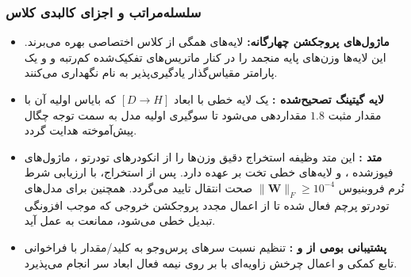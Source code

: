 \subsubsection*{سلسله‌مراتب و اجزای کالبدی کلاس}
\begin{itemize}
    \item \textbf{ماژول‌های پروجکشن چهارگانه:} لایه‌های  همگی از کلاس اختصاصی  بهره می‌برند. این لایه‌ها وزن‌های پایه منجمد  را در کنار ماتریس‌های تفکیک‌شده کم‌رتبه  و  و یک پارامتر مقیاس‌گذار یادگیری‌پذیر به نام  نگهداری می‌کنند.
    \item \textbf{لایه گیتینگ تصحیح‌شده :} یک لایه خطی با ابعاد $[D \to H]$ که بایاس اولیه آن با مقدار مثبت $1.8$ مقداردهی می‌شود تا سوگیری اولیه مدل به سمت توجه چگال پیش‌آموخته هدایت گردد.
    \item \textbf{متد :} این متد وظیفه استخراج دقیق وزن‌ها را از انکودرهای تودرتو ، ماژول‌های فیوزشده ، و لایه‌های خطی تخت  بر عهده دارد. پس از استخراج، با ارزیابی شرط نُرم فروبنیوس $\|\mathbf{W}\|_F \ge 10^{-4}$ صحت انتقال تایید می‌گردد. همچنین برای مدل‌های تودرتو پرچم  فعال شده تا از اعمال مجدد پروجکشن خروجی که موجب افزونگی تبدیل خطی می‌شود، ممانعت به عمل آید.
    \item \textbf{پشتیبانی بومی از  و :} تنظیم نسبت سرهای پرس‌وجو به کلید/مقدار با فراخوانی تابع کمکی  و اعمال چرخش زاویه‌ای با  بر روی نیمه فعال ابعاد سر انجام می‌پذیرد.
\end{itemize}

